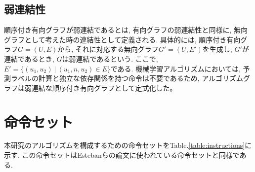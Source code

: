 \documentclass[11pt,oneside,openany,report]{jsbook}
\begin{document}
\section{弱連結性}
順序付き有向グラフが弱連結であるとは, 有向グラフの弱連結性と同様に, 無向グラフとして考えた時の連結性として定義される. 具体的には, 順序付き有向グラフ$G = (U, E)$から, それに対応する無向グラフ$G' = (U, E')$を生成し, $G'$が連結であるとき, $G$は弱連結であるという. ここで, $E' = \{(u_1, u_2)\ |\ (u_1, n, u_2) \in E\}$である. 機械学習アルゴリズムにおいては, 予測ラベルの計算と独立な依存関係を持つ命令は不要であるため, アルゴリズムグラフは弱連結な順序付き有向グラフとして定式化した。

\chapter{命令セット} \label{chap:ops}

本研究のアルゴリズムを構成するための命令セットをTable.\ref{table:instructions}に示す. この命令セットはEstebanらの論文\cite{automl_zero}に使われている命令セットと同様である.
\end{document}
